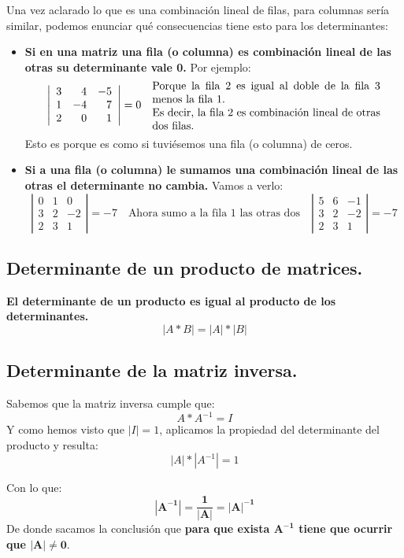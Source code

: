 \documentclass[a4paper,11pt,answers]{exam}
\begin{document}
Una vez aclarado lo que es una combinación lineal de filas, para columnas sería similar, podemos enunciar qué consecuencias tiene esto para los determinantes:
\begin{itemize}
	\item \textbf{Si en una matriz una fila (o columna) es combinación lineal de las otras su determinante vale 0.} Por ejemplo:
	\[\left|\begin{array}{rrr}
		3&4&-5\\
		1&-4&7\\
		2&0&1\\
	\end{array}\right| = 0\quad \text{\parbox{.6\linewidth}{Porque la fila 2 es igual al doble de la fila 3 menos la fila 1.\\Es decir, la fila 2 es combinación lineal de otras dos filas.}}\]
	Esto es porque es como si tuviésemos una fila (o columna) de ceros.
	\item \textbf{Si a una fila (o columna) le sumamos una combinación lineal de las otras el determinante no cambia.} Vamos a verlo:
	\[\left|\begin{array}{rrr}
		0&1&0\\
		3&2&-2\\
		2&3&1
	\end{array}\right| = -7 \quad\text{Ahora sumo a la fila 1 las otras dos}\quad\left|\begin{array}{rrr}
	5&6&-1\\
	3&2&-2\\
	2&3&1
\end{array}\right| = -7
	\]
\end{itemize}

\subsection{Determinante de un producto de matrices.}
\textbf{El determinante de un producto es igual al producto de los determinantes.}
\[|A*B| = |A|*|B|\]

\subsection{Determinante de la matriz inversa.}
Sabemos que la matriz inversa cumple que:
\[A*A^{-1} = I\]
Y como hemos visto que $|I| = 1$, aplicamos la propiedad del determinante del producto y resulta:
\[|A|*|A^{-1}| = 1\]

Con lo que:
\[\boldsymbol{|A^{-1}| = \frac{1}{|A|} = |A|^{-1}}\]
De donde sacamos la conclusión que \textbf{para que exista $\boldsymbol{A^{-1}}$ tiene que ocurrir que $\boldsymbol{|A| \neq 0}$}.
\end{document}
